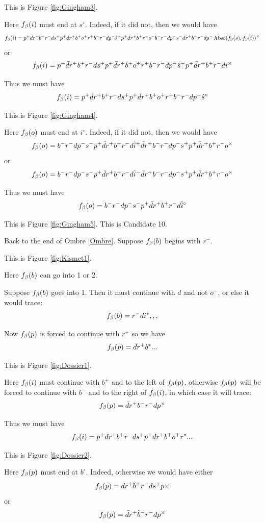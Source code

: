 This is Figure \ref{fig:Gingham3}.

Here $f_\beta(i)$ must end at $s^\circ$. Indeed, if it did not, then we would have
\[
f_\beta(i) = p^+ \bar{d} r^+ b^+ r^- d s^+ p^+ \bar{d} r^+ b^+ o^+ r^+ b^- r^- d p^- \hat{s}^+ p^+ \bar{d} r^+ b^+ r^- o^- b^- r^- d p^- s^- \bar{d} r^+ b^- r^- d p^- \operatorname{Abso}(f_\beta(s), f_\beta(i))^\times
\]
or
\[
f_\beta(i) = p^+ \bar{d} r^+ b^+ r^- d s^+ p^+ \bar{d} r^+ b^+ o^+ r^+ b^- r^- d p^- \hat{s}^- p^+ \bar{d} r^+ b^+ r^- d i^\times
\]

Thus we must have
\[
f_\beta(i) = p^+ \bar{d} r^+ b^+ r^- d s^+ p^+ \bar{d} r^+ b^+ o^+ r^+ b^- r^- d p^- \hat{s}^\circ
\]

This is Figure \ref{fig:Gingham4}. 

Here $f_\beta(o)$ must end at $i^\circ$. Indeed, if it did not, then we would have
\[
f_\beta(o) = b^- r^- d p^- s^- p^+ \bar{d} r^+ b^+ r^- d \hat{i}^+ \bar{d} r^+ b^- r^- d p^- s^+ p^+ \bar{d} r^+ b^+ r^- o^\times
\]
or
\[
f_\beta(o) = b^- r^- d p^- s^- p^+ \bar{d} r^+ b^+ r^- d \hat{i}^- \bar{d} r^+ b^- r^- d p^- s^+ p^+ \bar{d} r^+ b^+ r^- o^\times
\]

Thus we must have
\[
f_\beta(o) = b^- r^- d p^- s^- p^+ \bar{d} r^+ b^+ r^- d \hat{i}^\circ
\]

This is Figure \ref{fig:Gingham5}. This is Candidate 10.

\label{Kismet}
Back to the end of Ombre \ref{Ombre}. Suppose $f_\beta(b)$ begins with $r^-$. 

This is Figure \ref{fig:Kismet1}.

Here $f_\beta(b)$ can go into 1 or 2.

\label{Dossier}
Suppose $f_\beta(b)$ goes into 1. Then it must continue with $d$ and not $o^-$, or else it would trace:
\[
f_\beta(b) = r^- d i^*,,,
\]

Now $f_\beta(p)$ is forced to continue with $r^+$ so we have
\[
f_\beta(p) = \bar{d} r^+ b^*...
\]

This is Figure \ref{fig:Dossier1}.

Here $f_\beta(i)$ must continue with $b^+$ and to the left of $f_\beta(p)$, otherwise $f_\beta(p)$ will be forced to continue with $b^-$ and to the right of $f_\beta(i)$, in which case it will trace:
\[
f_\beta(p) = \bar{d} r^+ b^- r^- d p^\times
\]

Thus we must have
\[
f_\beta(i) = p^+ \bar{d} r^+ b^+ r^- d s^+ p^+ \bar{d} r^+ b^+ o^+ r^*...
\]

This is Figure \ref{fig:Dossier2}.

Here $f_\beta(p)$ must end at $b^\circ$. Indeed, otherwise we would have either
\[
f_\beta(p) = \bar{d} r^+ \hat{b}^+ r^- d s^+ p\times
\]
or
\[
f_\beta(p) = \bar{d} r^+ \hat{b}^- r^- d p^\times
\]

